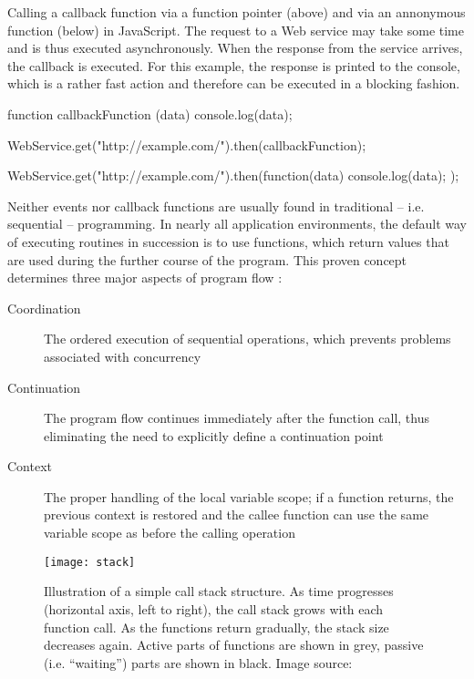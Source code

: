 \begin{program}
  \caption{Calling a callback function via a function pointer (above) and via an annonymous function (below) in JavaScript. The request to a Web service may take some time and is thus executed asynchronously. When the response from the service arrives, the callback is executed. For this example, the response is printed to the console, which is a rather fast action and therefore can be executed in a blocking fashion.}
  \label{prog:callback}
  \begin{JavaCode}
function callbackFunction (data) {
    console.log(data);
}
  
WebService.get("http://example.com/").then(callbackFunction);
  \end{JavaCode}
\begin{JavaCode}
WebService.get("http://example.com/").then(function(data) {
    console.log(data);
});
  \end{JavaCode}
\end{program}

Neither events nor callback functions are usually found in traditional -- i.e. sequential -- programming. In nearly all application environments, the default way of executing routines in succession is to use functions, which return values that are used during the further course of the program. This proven concept determines three major aspects of program flow \cite[p. 3]{Hohpe2006}:

\begin{description}
  \item[Coordination] The ordered execution of sequential operations, which prevents problems associated with concurrency
  \item[Continuation] The program flow continues immediately after the function call, thus eliminating the need to explicitly define a continuation point
  \item[Context] The proper handling of the local variable scope; if a function returns, the previous context is restored and the callee function can use the same variable scope as before the calling operation  
\end{description}

\begin{figure}
\centering\small
\setlength{\tabcolsep}{0mm}
  \texttt{[image: stack]}
\caption{
Illustration of a simple call stack structure. As time progresses (horizontal axis, left to right), the call stack grows with each function call. As the functions return gradually, the stack size decreases again. Active parts of functions are shown in grey, passive (i.e. ``waiting'') parts are shown in black. Image source: \cite{Hohpe2006}
}
\label{fig:stack}
\end{figure}

